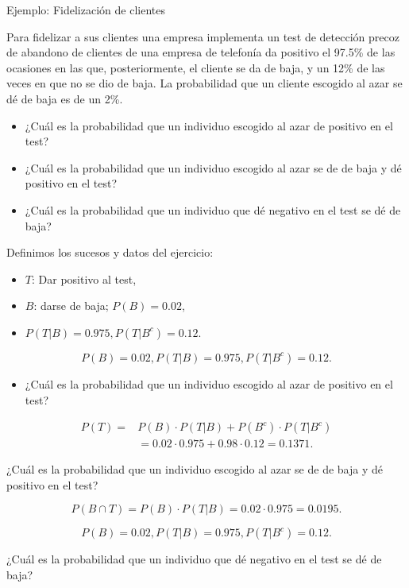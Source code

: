 \documentclass[
  letterpaper,
  DIV=11,
  numbers=noendperiod]{scrreprt}
\providecommand{\tightlist}{%
  \setlength{\itemsep}{0pt}\setlength{\parskip}{0pt}}\usepackage{longtable,booktabs,array}
\begin{document}
\begin{Ejemplo}{Ejemplo: Fidelización de clientes}{}

Para fidelizar a sus clientes una empresa implementa un test de
detección precoz de abandono de clientes de una empresa de telefonía da
positivo el 97.5\% de las ocasiones en las que, posteriormente, el
cliente se da de baja, y un 12\% de las veces en que no se dio de baja.
La probabilidad que un cliente escogido al azar se dé de baja es de un
2\%.

\begin{itemize}
\tightlist
\item
  ¿Cuál es la probabilidad que un individuo escogido al azar de positivo
  en el test?
\item
  ¿Cuál es la probabilidad que un individuo escogido al azar se de de
  baja y dé positivo en el test?
\item
  ¿Cuál es la probabilidad que un individuo que dé negativo en el test
  se dé de baja?
\end{itemize}

Definimos los sucesos y datos del ejercicio:

\begin{itemize}
\tightlist
\item
  \(T\): Dar positivo al test,
\item
  \(B\): darse de baja; \(P(B)=0.02\),
\item
  \(P(T|B)=0.975, P(T|B^c)=0.12\).
\end{itemize}

\[P(B)=0.02, P(T|B)=0.975, P(T|B^c)=0.12.\]

\begin{itemize}
\tightlist
\item
  ¿Cuál es la probabilidad que un individuo escogido al azar de positivo
  en el test?
\end{itemize}

\[
\begin{array}{rl}
P(T) = & P(B)\cdot P(T|B)+P(B^c)\cdot P(T|B^c)\\[1ex]
& =0.02\cdot 0.975+0.98\cdot 0.12=0.1371.
\end{array}
\]

¿Cuál es la probabilidad que un individuo escogido al azar se de de baja
y dé positivo en el test?

\[P(B\cap T)= P(B)\cdot P(T|B)=0.02\cdot 0.975=0.0195.\]

\[P(B)=0.02, P(T|B)=0.975, P(T|B^c)=0.12.\]

¿Cuál es la probabilidad que un individuo que dé negativo en el test se
dé de baja?


\end{Ejemplo}
\end{document}
